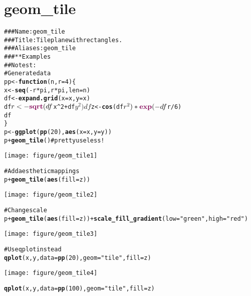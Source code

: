 \documentclass[a4paper,titlepage]{tufte-handout}\usepackage{graphicx, color}
\makeatletter
\def\maxwidth{ %
  \ifdim\Gin@nat@width>\linewidth
    \linewidth
  \else
    \Gin@nat@width
  \fi
}
\newcommand{\hlfunctioncall}[1]{\textcolor[rgb]{0.501960784313725,0,0.329411764705882}{\textbf{#1}}}%
\newcommand{\hlstring}[1]{\textcolor[rgb]{0.6,0.6,1}{#1}}%
\newcommand{\hlcomment}[1]{\textcolor[rgb]{0.180392156862745,0.6,0.341176470588235}{#1}}%
\newenvironment{kframe}{%
 \def\at@end@of@kframe{}%
 \ifinner\ifhmode%
  \def\at@end@of@kframe{\end{minipage}}%
  \begin{minipage}{\columnwidth}%
 \fi\fi%
 \def\FrameCommand##1{\hskip\@totalleftmargin \hskip-\fboxsep
 \colorbox{shadecolor}{##1}\hskip-\fboxsep
     \hskip-\linewidth \hskip-\@totalleftmargin \hskip\columnwidth}%
 \MakeFramed {\advance\hsize-\width
   \@totalleftmargin\z@ \linewidth\hsize
   \@setminipage}}%
 {\par\unskip\endMakeFramed%
 \at@end@of@kframe}
\newenvironment{knitrout}{}{} %
\makeatother
\begin{document}
\section{geom\_tile}

\begin{knitrout}
\color{fgcolor}\begin{kframe}
\begin{alltt}
\hlcomment{### Name: geom_tile}
\hlcomment{### Title: Tile plane with rectangles.}
\hlcomment{### Aliases: geom_tile}
\hlcomment{### ** Examples}
\hlcomment{## No test: }
\hlcomment{# Generate data}
pp <- \hlfunctioncall{function} (n,r=4) \{
 x <- \hlfunctioncall{seq}(-r*pi, r*pi, len=n)
 df <- \hlfunctioncall{expand.grid}(x=x, y=x)
 df$r <- \hlfunctioncall{sqrt}(df$x^2 + df$y^2)
 df$z <- \hlfunctioncall{cos}(df$r^2)*\hlfunctioncall{exp}(-df$r/6)
 df
\}
p <- \hlfunctioncall{ggplot}(\hlfunctioncall{pp}(20), \hlfunctioncall{aes}(x=x,y=y))
p + \hlfunctioncall{geom_tile}() \hlcomment{#pretty useless!}
\end{alltt}
\end{kframe}\texttt{[image: figure/geom\_tile1]} \begin{kframe}\begin{alltt}
\hlcomment{# Add aesthetic mappings}
p + \hlfunctioncall{geom_tile}(\hlfunctioncall{aes}(fill=z))
\end{alltt}
\end{kframe}\texttt{[image: figure/geom\_tile2]} \begin{kframe}\begin{alltt}
\hlcomment{# Change scale}
p + \hlfunctioncall{geom_tile}(\hlfunctioncall{aes}(fill=z)) + \hlfunctioncall{scale_fill_gradient}(low=\hlstring{"green"}, high=\hlstring{"red"})
\end{alltt}
\end{kframe}\texttt{[image: figure/geom\_tile3]} \begin{kframe}\begin{alltt}
\hlcomment{# Use qplot instead}
\hlfunctioncall{qplot}(x, y, data=\hlfunctioncall{pp}(20), geom=\hlstring{"tile"}, fill=z)
\end{alltt}
\end{kframe}\texttt{[image: figure/geom\_tile4]} \begin{kframe}\begin{alltt}
\hlfunctioncall{qplot}(x, y, data=\hlfunctioncall{pp}(100), geom=\hlstring{"tile"}, fill=z)

\end{alltt}
\end{kframe}
\end{knitrout}
\end{document}
